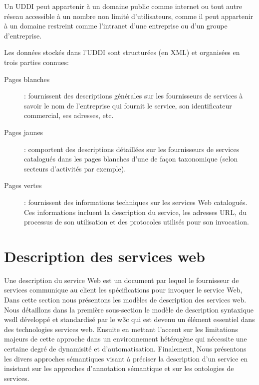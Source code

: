 	Un \textsc{UDDI} peut appartenir à un domaine public comme internet ou tout autre réseau accessible à un nombre
       	non limité d’utilisateurs, comme il peut appartenir à un domaine restreint comme l'intranet d’une entreprise 
	ou d'un groupe d'entreprise.

	Les données stockés dans l'UDDI sont structurées (en \textsc{XML}) et organisées en trois parties 
	connues:

	\begin{description} %
	    \item[Pages blanches]:
		fournissent des descriptions générales sur les fournisseurs de services à savoir le nom de 
		l'entreprise qui fournit le service, son identificateur commercial, ses adresses, etc.

	    \item[Pages jaunes]:
		comportent des descriptions détaillées sur les fournisseurs de services catalogués dans les pages 
		blanches d'une de façon taxonomique (selon secteurs d'activités par exemple).

	    \item[Pages vertes]:
		fournissent des informations techniques sur les services Web catalogués. Ces informations incluent 
		la description du service, les adresses \textsc{URL}, du processus de son utilisation 
		et des protocoles utilisés pour son invocation.

	\end{description}



\section{Description des services web} 

    Une description du service Web est un document par lequel le fournisseur de services communique au client 
    les spécifications pour invoquer le service Web, Dans cette section nous présentons les modèles de description
    des services web. Nous détaillons dans la première sous-section le modèle de description syntaxique \acrshort{wsdl}
    \cite{chinnici2007web} développé et standardisé par le \acrshort{w3c} qui est devenu un élément essentiel 
    dans des technologies services web. Ensuite en mettant l'accent sur les limitations majeurs de cette
    approche dans un environnement hétérogène qui nécessite une certaine degré de dynamisité et d'automatisation.
    Finalement, Nous présentons les divers approches sémantiques visant à préciser la description d'un
    service en insistant sur les approches d'annotation sémantique et sur les ontologies de services.
	\newpage
